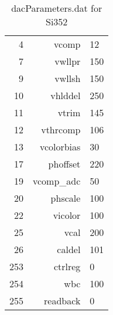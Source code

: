 \begin{table}[h!]
\begin{minipage}{.45\textwidth}
\begin{tabular}{rrl}
			4							& vcomp						& 12	\\
			7							& vwllpr					& 150	\\
			9							& vwllsh					& 150	\\
			10						& vhlddel					& 250	\\
			11						& vtrim						& 145	\\
			12						& vthrcomp				& 106	\\
			13						& vcolorbias			& 30	\\
			17						& phoffset				& 220	\\
			19						& vcomp\_adc			& 50	\\
			20						& phscale					& 100	\\
			22						& vicolor					& 100	\\
			25						& vcal						& 200	\\
			26						& caldel					& 101	\\
			253						& ctrlreg					& 0	\\
			254						& wbc							& 100	\\
			255						& readback				& 0	\\
		\end{tabular}
		\caption{dacParameters.dat for Si352}
	\end{minipage}
\end{table}
